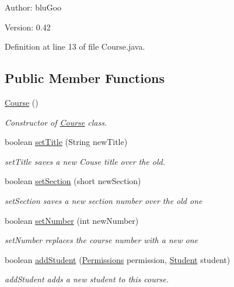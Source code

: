 \begin{Desc}
\item[Author:]bluGoo \end{Desc}
\begin{Desc}
\item[Version:]0.42 \end{Desc}


Definition at line 13 of file Course.java.\subsection*{Public Member Functions}
\begin{CompactItemize}
\item 
\hyperlink{classCourse_85d22954deffe5dd6c35c94304ac7092}{Course} ()
\begin{CompactList}\small\item\em Constructor of \hyperlink{classCourse}{Course} class. \item\end{CompactList}\item 
boolean \hyperlink{classCourse_fab2ecaf6ad860890161c693b7a3aa00}{setTitle} (String newTitle)
\begin{CompactList}\small\item\em setTitle saves a new Couse title over the old. \item\end{CompactList}\item 
boolean \hyperlink{classCourse_93bd3af1063181e32bcc4cddb3e2348b}{setSection} (short newSection)
\begin{CompactList}\small\item\em setSection saves a new section number over the old one \item\end{CompactList}\item 
boolean \hyperlink{classCourse_43edb09a6091becee394eb5a5cd7a17a}{setNumber} (int newNumber)
\begin{CompactList}\small\item\em setNumber replaces the course number with a new one \item\end{CompactList}\item 
boolean \hyperlink{classCourse_5b9c0561583f36cd8ad5d04712d19c82}{addStudent} (\hyperlink{classPermissions}{Permissions} permission, \hyperlink{classStudent}{Student} student)
\begin{CompactList}\small\item\em addStudent adds a new student to this course. \item\end{CompactList}\item 

\end{CompactItemize}
